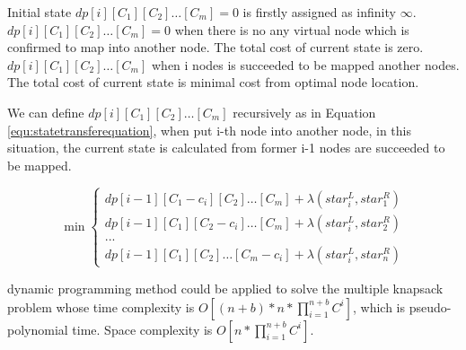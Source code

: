 Initial state $dp[i][{C_1}][{C_2}] \ldots [{C_m}]=0$ is firstly assigned as infinity $\infty$. $dp[i][{C_1}][{C_2}] \ldots [{C_m}]=0$ when there is no any virtual node which is confirmed to map into another node. The total cost of current state is zero. $dp[i][{C_1}][{C_2}] \ldots [{C_m}]$ when  i nodes is succeeded to be mapped another nodes. The total cost of current state is minimal cost from optimal node location.

We can define $dp[i][{C_1}][{C_2}] \ldots [{C_m}]$ recursively as in Equation \ref{equ:statetransferequation}, when put i-th node into another node, in this situation, the current state is calculated from former i-1 nodes are succeeded to be mapped.

\begin{equation}
\label{equ:statetransferequation}
\min \left\{ \begin{array}{l}
dp[i - 1][{C_1-c_i}][{C_2}] \ldots [{C_m}]+\lambda(star^L_i,star^R_1)\\
dp[i - 1][{C_1}][{C_2-c_i}] \ldots [{C_m}]+\lambda(star^L_i,star^R_2)\\
...\\
dp[i - 1][{C_1}][{C_2}] \ldots [{C_m-c_i}]+\lambda(star^L_i,star^R_n)
\end{array} \right.
\end{equation}

dynamic programming method  could be applied to solve the multiple knapsack problem whose time complexity is $O[(n+b)*n*\prod_{i=1}^{n+b}C^i]$, which is pseudo-polynomial time. Space complexity is $O[n*\prod_{i=1}^{n+b}C^i]$.








